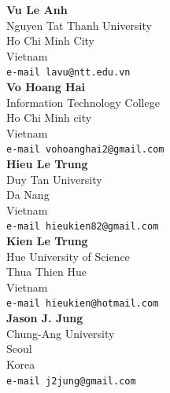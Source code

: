 \documentclass[10pt,leqno,twoside]{article}
\begin{document}
\noindent\textbf{Vu Le Anh}\\
Nguyen Tat Thanh University\\
Ho Chi Minh City\\
Vietnam\\
{\tt e-mail lavu@ntt.edu.vn}\\

\noindent\textbf{Vo Hoang Hai}\\
Information Technology College\\
Ho Chi Minh city\\
Vietnam\\
{\tt e-mail vohoanghai2@gmail.com}\\

\noindent\textbf{Hieu Le Trung}\\
Duy Tan University\\
Da Nang\\
Vietnam\\
{\tt e-mail hieukien82@gmail.com}\\

\noindent\textbf{Kien Le Trung}\\
Hue University of Science\\
Thua Thien Hue\\
Vietnam\\
{\tt e-mail hieukien@hotmail.com}\\

\noindent\textbf{Jason J. Jung}\\
Chung-Ang University\\
Seoul\\
Korea\\
{\tt e-mail j2jung@gmail.com }
\end{document}

